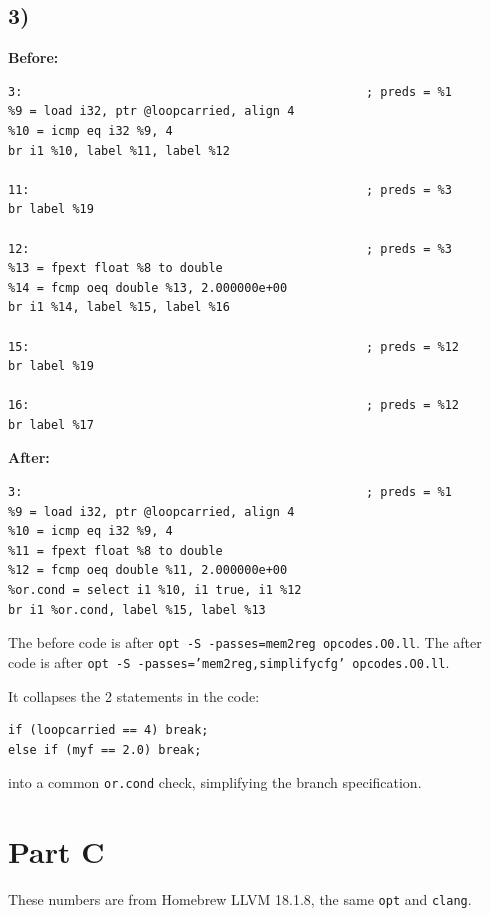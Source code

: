 \documentclass[11pt,a4paper]{article}
\begin{document}
\subsection*{3)}

\textbf{Before:}

\begin{lstlisting}
3:                                                ; preds = %1
%9 = load i32, ptr @loopcarried, align 4
%10 = icmp eq i32 %9, 4
br i1 %10, label %11, label %12

11:                                               ; preds = %3
br label %19

12:                                               ; preds = %3
%13 = fpext float %8 to double
%14 = fcmp oeq double %13, 2.000000e+00
br i1 %14, label %15, label %16

15:                                               ; preds = %12
br label %19

16:                                               ; preds = %12
br label %17
\end{lstlisting}

\textbf{After:}

\begin{lstlisting}
3:                                                ; preds = %1
%9 = load i32, ptr @loopcarried, align 4
%10 = icmp eq i32 %9, 4
%11 = fpext float %8 to double
%12 = fcmp oeq double %11, 2.000000e+00
%or.cond = select i1 %10, i1 true, i1 %12
br i1 %or.cond, label %15, label %13
\end{lstlisting}

The before code is after \texttt{opt -S -passes=mem2reg opcodes.O0.ll}.
The after code is after
\texttt{opt -S -passes='mem2reg,simplifycfg' opcodes.O0.ll}.

It collapses the 2 statements in the code:

\begin{lstlisting}[language={}]
if (loopcarried == 4) break;
else if (myf == 2.0) break;
\end{lstlisting}

into a common \texttt{or.cond} check, simplifying the branch specification.

\section{Part C}

These numbers are from Homebrew LLVM 18.1.8, the same
\texttt{opt} and \texttt{clang}.
\end{document}
